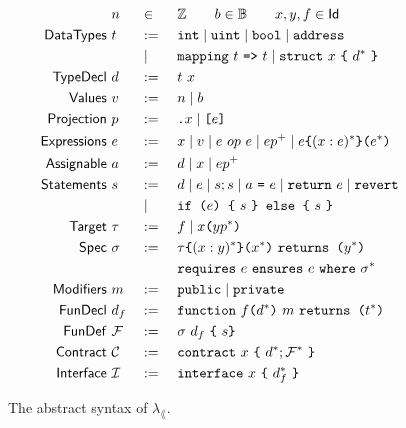 \begin{figure}
  \begin{alignat*}{3}
    &~ n && \in && \mathbb{Z} \qquad b \in \mathbb{B} \qquad x,y,f \in \mathsf{Id}   \\
    \mathsf{Data Types} &~ t && :=\ && \texttt{int} \mid \texttt{uint} \mid \texttt{bool} \mid \texttt{address} \\
                &~   && \mid\ && \texttt{mapping} ~t~ \texttt{=>} ~t \mid \texttt{struct} ~x~ \texttt{\{}~ d^* ~\texttt{\}} \\
    \mathsf{Type Decl}    &~ d && :=\ && t ~ x \\
    \mathsf{Values}      &~ v && :=\ && n \mid b \\
    \mathsf{Projection}  &~ p && :=\ && \texttt{.}x \mid \texttt{[}e\texttt{]} \\
    \mathsf{Expressions} &~ e && :=\ && x \mid v \mid e ~op~ e \mid e p^+ \mid {e}\texttt{\{}{(x: e)^*}\texttt{\}(}{e^*}\texttt{)} \\
    \mathsf{Assignable}  &~ a && :=\ && d \mid x \mid e p^+ \\
    \mathsf{Statements}  &~ s && :=\ && d \mid e \mid s; s \mid a ~\texttt{=}~ e \mid \texttt{return}~ e \mid \texttt{revert} \\
                      &~   && \mid\ && \texttt{if (}e\texttt{) \{}~ s ~\texttt{\} else \{}~ s ~\texttt{\}} \\
    \mathsf{Target}      &~ \tau && :=\ && f \mid x \texttt{(} y p^* \texttt{)} \\
    \mathsf{Spec}        &~ \sigma && :=\ && {\tau}\texttt{\{}{(x : y)^*}\texttt{\}(}{x^*}\texttt{)} ~\texttt{returns (}{y^*}\texttt{)} \\
                      &~        &&     && \texttt{requires}~ {e} ~\texttt{ensures}~ {e} ~\texttt{where}~ {\sigma^*} \\
    \mathsf{Modifiers}   &~ m && :=\ && \texttt{public} \mid \texttt{private} \\
    \mathsf{Fun Decl}    &~ d_f && :=\ && \texttt{function}~ {f}\texttt{(}{d^*}\texttt{)} ~ {m} ~\texttt{returns (}{t^*}\texttt{)} \\
    \mathsf{Fun Def}     &~ \mathcal{F}&& :=\ && \sigma ~ d_f ~ \texttt{\{} ~ s \texttt{\}} \\
    \mathsf{Contract}    &~ \mathcal{C}&& :=\ && \texttt{contract}~ {x}~ \texttt{\{}~ {d^*}; {\mathcal{F}^*} ~\texttt{\}} \\
    \mathsf{Interface}   &~ \mathcal{I}&& :=\ && \texttt{interface}~ {x}~ \texttt{\{}~ {d_f^*} ~\texttt{\}}
  \end{alignat*}
  \caption{The abstract syntax of $\lambda_\lang$.}
  \label{fig:syntax}
\end{figure}

\iffalse

